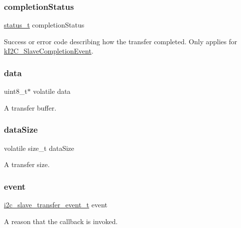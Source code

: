 \subsubsection{\texorpdfstring{completionStatus}{completionStatus}}
{\footnotesize\ttfamily \mbox{\hyperlink{group__ksdk__common_gaaabdaf7ee58ca7269bd4bf24efcde092}{status\+\_\+t}} completion\+Status}

Success or error code describing how the transfer completed. Only applies for \mbox{\hyperlink{group__i2c__driver_gga87e42e170b60f17f657ef3c06a918133a38cca3cd668e73f51b8e574835d419df}{k\+I2\+C\+\_\+\+Slave\+Completion\+Event}}. \mbox{\label{struct__i2c__slave__transfer_a6df23c71c49ca7371f41136934d4fad1}} 
\subsubsection{\texorpdfstring{data}{data}}
{\footnotesize\ttfamily uint8\+\_\+t$\ast$ volatile data}

A transfer buffer. \mbox{\label{struct__i2c__slave__transfer_aec81567ca73e5b0cb790098785e345c5}} 
\subsubsection{\texorpdfstring{dataSize}{dataSize}}
{\footnotesize\ttfamily volatile size\+\_\+t data\+Size}

A transfer size. \mbox{\label{struct__i2c__slave__transfer_ad43dfdc1308f39dd4bff91414c1cce2c}} 
\subsubsection{\texorpdfstring{event}{event}}
{\footnotesize\ttfamily \mbox{\hyperlink{group__i2c__driver_ga95f120f6a73af41648364538cf9a6eca}{i2c\+\_\+slave\+\_\+transfer\+\_\+event\+\_\+t}} event}

A reason that the callback is invoked. \mbox{\label{struct__i2c__slave__transfer_a97856cb5d71b7981d4ce9813124a5433}} 
